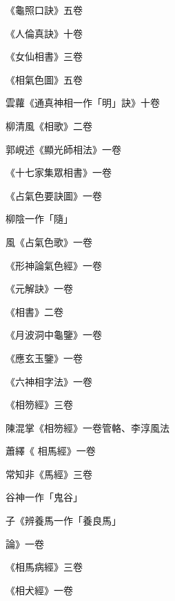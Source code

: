 \begin{pinyinscope}
 《龜照口訣》五卷



 《人倫真訣》十卷



 《女仙相書》三卷



 《相氣色圖》五卷



 雲蘿《通真神相一作「明」訣》十卷



 柳清風《相歌》二卷



 郭峴述《顯光師相法》一卷



 《十七家集眾相書》一卷



 《占氣色要訣圖》一卷



 柳陰一作「隨」



 風《占氣色歌》一卷



 《形神論氣色經》一卷



 《元解訣》一卷



 《相書》二卷



 《月波洞中龜鑒》一卷



 《應玄玉鑒》一卷



 《六神相字法》一卷



 《相笏經》三卷



 陳混掌《相笏經》一卷管輅、李淳風法



 蕭繹《
 相馬經》一卷



 常知非《馬經》三卷



 谷神一作「鬼谷」



 子《辨養馬一作「養良馬」



 論》一卷



 《相馬病經》三卷



 《相犬經》一卷




\end{pinyinscope}
